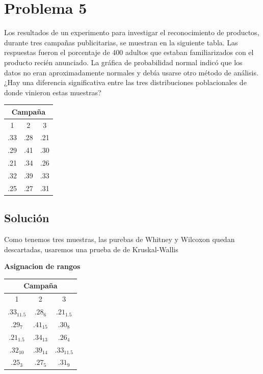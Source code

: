 \documentclass{article}
\begin{document}
\section{Problema 5}
Los resultados de un experimento para investigar el reconocimiento de productos, durante tres campañas publicitarias, se muestran en la siguiente tabla. Las respuestas fueron el porcentaje de 400 adultos que estaban familiarizados con el producto recién anunciado. La gráfica de probabilidad normal indicó que los datos no eran aproximadamente normales y debía usarse otro método de análisis. ¿Hay una diferencia significativa entre las tres distribuciones poblacionales de donde vinieron estas muestras?

\begin{center}
    \begin{tabular}{c |c |c}
        \multicolumn{3}{c}{Campaña} \\
        \hline
        1   & 2   & 3               \\
        .33 & .28 & .21             \\
        .29 & .41 & .30             \\
        .21 & .34 & .26             \\
        .32 & .39 & .33             \\
        .25 & .27 & .31             \\
    \end{tabular}
\end{center}

\subsection*{Solución}

Como tenemos tres muestras, las purebas de Whitney y Wilcoxon quedan descartadas, usaremos una prueba de de Kruskal-Wallis

\textbf{Asignacion de rangos}

\begin{center}
    \begin{tabular}{c |c |c}
        \multicolumn{3}{c}{Campaña}              \\
        \hline
        1            & 2          & 3            \\
        $.33_{11.5}$ & $.28_{6}$  & $.21_{1.5}$  \\
        $.29_{7}$    & $.41_{15}$ & $.30_{8}$    \\
        $.21_{1.5}$  & $.34_{13}$ & $.26_{4}$    \\
        $.32_{10}$   & $.39_{14}$ & $.33_{11.5}$ \\
        $.25_{3}$    & $.27_{5}$  & $.31_{9}$    \\
    \end{tabular}
\end{center}
\end{document}
